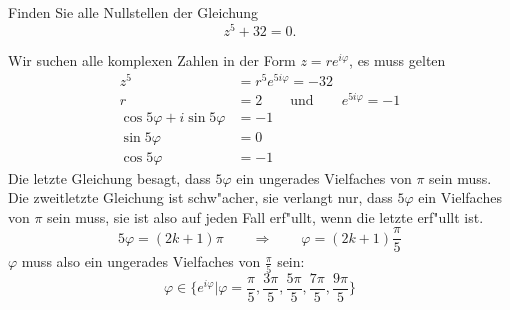 Finden Sie alle Nullstellen der Gleichung
\[
z^5+32=0.
\]

\begin{loesung}
Wir suchen alle komplexen Zahlen in der Form $z=re^{i\varphi}$, es muss gelten
\begin{align*}
z^5&=r^5e^{5i\varphi}=-32
\\
r&=2\qquad\text{und}\qquad e^{5i\varphi}=-1
\\
\cos 5\varphi+i\sin 5\varphi&=-1
\\
\sin 5\varphi&=0
\\
\cos 5\varphi&=-1
\end{align*}
Die letzte Gleichung besagt, dass $5\varphi$ ein ungerades Vielfaches von
$\pi$ sein muss. Die zweitletzte Gleichung ist schw"acher, sie verlangt
nur, dass $5\varphi$ ein Vielfaches von $\pi$ sein muss, sie ist also
auf jeden Fall erf"ullt, wenn die letzte erf"ullt ist.
\[
5\varphi=(2k+1)\pi
\qquad\Rightarrow\qquad
\varphi=(2k+1)\frac{\pi}5
\]
$\varphi$ muss also ein ungerades Vielfaches von $\frac{\pi}5$ sein:
\[
\varphi\in\biggl\{
e^{i\varphi}\bigg|
\varphi
=
\frac{\pi}{5},
\frac{3\pi}{5},
\frac{5\pi}{5},
\frac{7\pi}{5},
\frac{9\pi}{5}
\biggr\}
\]
\end{loesung}

